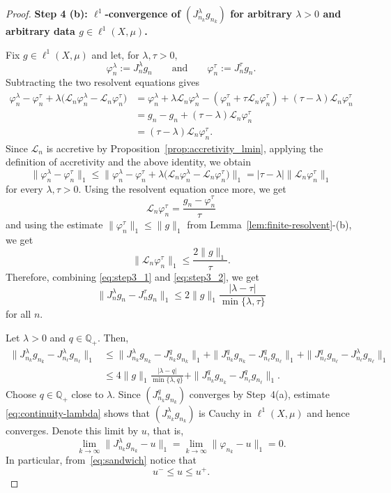 \documentclass[letterpaper]{article}
\theoremstyle{definition}
\theoremstyle{named}
\numberwithin{equation}{section}
\newcommand{\lm}{\lambda}
\newcommand{\Lmin}{\mathcal{L}_{n}}
\begin{document}
\begin{proof}
\medskip
\noindent
\textbf{Step 4 (b): $\ell^1$-convergence of $(J_{n_k}^\lambda g_{n_k})$ for arbitrary $\lambda >0$ and arbitrary data $g \in \ell^1(X,\mu)$.}

Fix $g\in \ell^1(X,\mu)$ and let, for $\lm, \tau >0$,
\[
\varphi_n^\lambda:=J_n^\lambda g_n
\qquad \text{and} \qquad
\varphi_n^\tau:=J_n^\tau g_n.
\]
Subtracting the two resolvent equations gives
\begin{align*}
   \varphi_n^\lambda-\varphi_n^\tau+\lambda\bigl(\Lmin\varphi_n^\lambda-\Lmin\varphi_n^\tau\bigr)
&= \varphi_n^\lambda + \lambda \Lmin\varphi_n^\lambda - (\varphi_n^\tau + \tau\Lmin\varphi_n^\tau)  +  (\tau - \lambda) \Lmin\varphi_n^\tau\\
&= g_n - g_n +  (\tau - \lambda) \Lmin\varphi_n^\tau \\
&=  (\tau - \lambda) \Lmin\varphi_n^\tau.
\end{align*}
Since $\Lmin$ is accretive by Proposition~\ref{prop:accretivity_lmin}, 
applying the definition of accretivity
and the above identity, we obtain
\begin{equation}\label{eq:step3_1}
 \|\varphi_n^\lambda-\varphi_n^\tau\|_1
\leq \| \varphi_n^\lambda-\varphi_n^\tau+\lambda\bigl(\Lmin\varphi_n^\lambda-\Lmin\varphi_n^\tau\bigr) \|_1 = |\tau-\lambda|\|\Lmin\varphi_n^\tau\|_1
\end{equation}
for every  $\lambda, \tau >0$.
Using the resolvent equation once more, we get
\[
\Lmin\varphi_n^\tau=\frac{g_n  -\varphi_n^\tau}{\tau}
\]
and using the estimate $\|\varphi_n^\tau\|_1 \leq  \|g\|_1$ from 
Lemma~\ref{lem:finite-resolvent}-(b), we get
\begin{equation}\label{eq:step3_2}
\|\Lmin\varphi_n^\tau\|_1\leq \frac{2\|g\|_1}{\tau}.
\end{equation}
Therefore, combining \eqref{eq:step3_1} and \eqref{eq:step3_2}, we get
\begin{equation*}
\|J_n^\lambda g_n-J_n^\tau g_n\|_1
\leq 2\|g\|_1\frac{|\lambda-\tau|}{\min\{\lambda,\tau\}}
\end{equation*}
for all $n$.

Let $\lambda>0$ and $q \in \mathbb{Q}_+$. Then,
\begin{align}
  \|J_{n_k}^\lambda g_{n_k} - J_{n_\ell}^\lambda g_{n_\ell}\|_1 &\leq   \|J_{n_k}^\lambda g_{n_k} - J_{n_k}^q g_{n_k}\|_1 +  \|J_{n_k}^q g_{n_k} - J_{n_\ell}^q g_{n_\ell}\|_1 +  \|J_{n_\ell}^q g_{n_\ell} - J_{n_\ell}^\lambda g_{n_\ell}\|_1\nonumber \\
  &\leq 4\|g\|_1\frac{|\lambda-q|}{\min\{\lambda, q\}}
+ \|J_{n_k}^q g_{n_k} - J_{n_\ell}^q g_{n_\ell}\|_1. \label{eq:continuity-lambda}
\end{align}
Choose $q\in \mathbb Q_+$ close to $\lambda$. Since $(J_{n_k}^q g_{n_k})$ converges 
by Step~4(a), estimate \eqref{eq:continuity-lambda} shows that $(J_{n_k}^\lambda g_{n_k})$ is Cauchy in $\ell^1(X,\mu)$ and hence converges. Denote this limit by $u$, that is,
\begin{equation}\label{eq:varphi_n-->u_2}
 \lim_{k\to \infty} \|  J_{n_k}^\lambda g_{n_k} - u\|_1 = \lim_{k\to \infty} \|  \varphi_{n_k} - u\|_1 =0.
\end{equation}
In particular, from~\eqref{eq:sandwich} notice that
$$
u^- \leq u \leq u^+.
$$


\end{proof}
\end{document}

